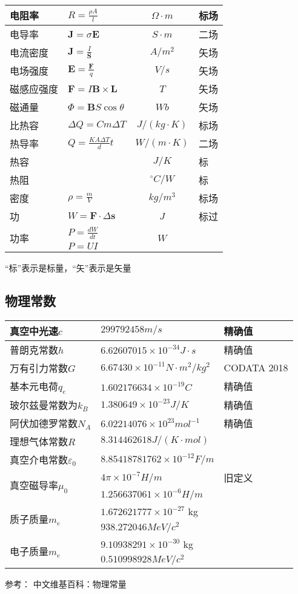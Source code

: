 \begin{tabular}{l|l|c|l}
电阻率 & $R=\frac{\rho A}{l}$ & $\Omega\cdot m$ & 标场 \\ \hline
电导率 & $\bm{J}=\sigma\bm{E}$ & $S\cdot m$ & 二场 \\ \hline
电流密度 & $\bm{J}=\frac{I}{\bm{S}}$ & $A/m^2$ & 矢场 \\ \hline
电场强度 & $\bm{E}=\frac{\bm{F}}{q}$ & $V/s$ & 矢场 \\ \hline
磁感应强度 & $\bm{F}=I\bm{B}\times \bm{L}$ & $T$ & 矢场 \\ \hline
磁通量 & $\Phi=\bm{B}S\cos\theta$ & $Wb$ & 矢场 \\ \hline
比热容 & $\Delta Q=Cm\Delta T$ & $J/(kg\cdot K)$ & 标场 \\ \hline
热导率 & $Q=\frac{KA\Delta T}{d}t$ & $W/(m\cdot K)$ & 二场 \\ \hline
热容 & & $J/K$ & 标 \\ \hline
热阻 & & $^{\circ}C/W$ & 标\\ \hline
密度 & $\rho=\frac{m}{V}$ & $kg/m^3$ & 标场 \\ \hline
功 & $W=\bm{F}\cdot \Delta\bm{s}$ & $J$ & 标过 \\ \hline
\multirow{2}{*}{功率} & $P=\frac{dW}{dt}$ & \multirow{2}{*}{$W$} \\
& $P=UI$ & \\ \hline
\end{tabular}

“标”表示是标量，“矢”表示是矢量

\subsection{物理常数}
\begin{tabular}{l|l|l}
\hline
真空中光速$c$ & $299792458 m/s$ & 精确值 \\ \hline
普朗克常数$h$ & $6.62607015×10^{-34} J\cdot s$ & 精确值 \\ \hline
万有引力常数$G$ & $6.67430×10^{-11} N\cdot m^2/kg^2$ & CODATA 2018 \\ \hline
基本元电荷$q_e$ & $1.602176634×10^{-19} C$ & 精确值 \\ \hline
玻尔兹曼常数为$k_B$ & $1.380649×10^{-23} J/K$ & 精确值 \\ \hline
阿伏加德罗常数$N_A$ & $6.02214076×10^{23} mol^{-1}$ & 精确值 \\ \hline
理想气体常数$R$ & $8.314462618 J/(K\cdot mol)$ & \\ \hline
真空介电常数$\varepsilon_0$ & $8.85418781762\times 10^{-12} F/m$\\ \hline
\multirow{2}{*}{真空磁导率$\mu_0$} & $4\pi\times 10^{-7}H/m$ & 旧定义 \\
& $1.256637061\times 10^{-6}H/m$ & \\ \hline
\multirow{2}{*}{质子质量$m_e$} & $1.672621777×10^{-27}$ kg\\
& $938.272046 MeV/c^2$\\ \hline
\multirow{2}{*}{电子质量$m_e$} & $9.10938291×10^{-30}$ kg\\
& $0.510998928 MeV/c^2$\\ \hline
\end{tabular}

参考：
中文维基百科：物理常量
